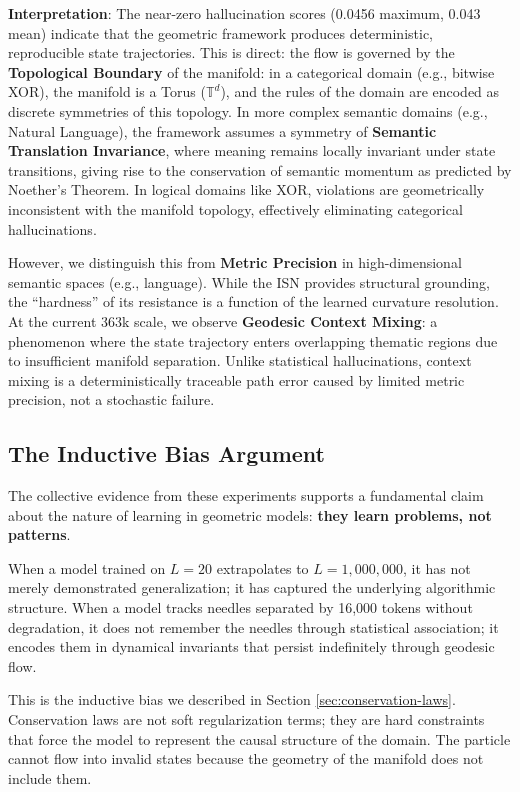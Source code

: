 \documentclass[12pt,a4paper]{article}
\begin{document}
\noindent\textbf{Interpretation}: The near-zero hallucination scores (0.0456 maximum, 0.043 mean) indicate that the geometric framework produces deterministic, reproducible state trajectories. This is direct: the flow is governed by the \textbf{Topological Boundary} of the manifold: in a categorical domain (e.g., bitwise XOR), the manifold is a Torus ($\mathbb{T}^d$), and the rules of the domain are encoded as discrete symmetries of this topology. In more complex semantic domains (e.g., Natural Language), the framework assumes a symmetry of \textbf{Semantic Translation Invariance}, where meaning remains locally invariant under state transitions, giving rise to the conservation of semantic momentum as predicted by Noether's Theorem. In logical domains like XOR, violations are geometrically inconsistent with the manifold topology, effectively eliminating categorical hallucinations.

However, we distinguish this from \textbf{Metric Precision} in high-dimensional semantic spaces (e.g., language). While the ISN provides structural grounding, the ``hardness'' of its resistance is a function of the learned curvature resolution. At the current 363k scale, we observe \textbf{Geodesic Context Mixing}: a phenomenon where the state trajectory enters overlapping thematic regions due to insufficient manifold separation. Unlike statistical hallucinations, context mixing is a deterministically traceable path error caused by limited metric precision, not a stochastic failure.

\subsection{The Inductive Bias Argument}
\label{sec:inductive-bias}

The collective evidence from these experiments supports a fundamental claim about the nature of learning in geometric models: \textbf{they learn problems, not patterns}.

When a model trained on $L = 20$ extrapolates to $L = 1,000,000$, it has not merely demonstrated generalization; it has captured the underlying algorithmic structure. When a model tracks needles separated by 16,000 tokens without degradation, it does not remember the needles through statistical association; it encodes them in dynamical invariants that persist indefinitely through geodesic flow.

This is the inductive bias we described in Section \ref{sec:conservation-laws}. Conservation laws are not soft regularization terms; they are hard constraints that force the model to represent the causal structure of the domain. The particle cannot flow into invalid states because the geometry of the manifold does not include them.
\end{document}

